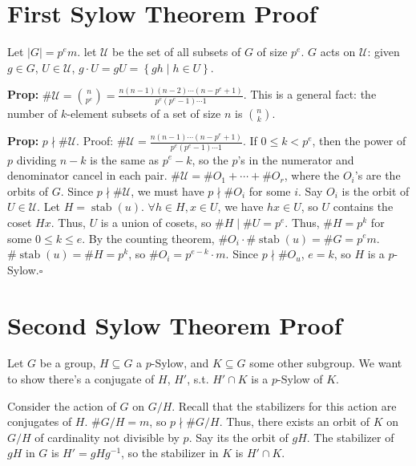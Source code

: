 \documentclass[10pt,letterpaper]{article}
\newcommand{\n}{\hfill\break}
\newcommand{\hangblock}[2]{\par\noindent\settowidth{\hangindent}{\textbf{#1: }}\textbf{#1: }\!\!\!#2}
\newcommand{\prop}[1]{\hangblock{Prop}{#1}}
\newcommand{\proven}{\;$\square$\n}
\newcommand{\card}[1]{\left|#1\right|}
\newcommand{\set}[1]{\left\{#1\right\}}
\newcommand{\inv}{^{-1}}
\newcommand{\ndiv}{\nmid}
\DeclareMathOperator{\stab}{stab}
\newcommand{\st}{s.t.}
\begin{document}
\newpage

\section*{First Sylow Theorem Proof}

\par\noindent
Let $\card{G}=p^{e}m$. let $\mathcal{U}$ be the set of all subsets of $G$ of size $p^{e}$.\n
$G$ acts on $\mathcal{U}$: given $g\in{}G$, $U\in\mathcal{U}$, $g\cdot{}U=gU=\set{gh\mid{}h\in{}U}$.\n

\prop{
	$\#\mathcal{U}=\binom{n}{p^{e}}=\frac{n(n-1)(n-2)\cdots(n-p^{e}+1)}{p^{e}(p^{e}-1)\cdots1}$. This is a general fact: the number of $k$-element subsets of a set of size $n$ is $\binom{n}{k}$.\n
}

\prop{
	$p\ndiv\#\mathcal{U}$.\n
	Proof: $\#\mathcal{U}=\frac{n(n-1)\cdots(n-p^{e}+1)}{p^{e}(p^{e}-1)\cdots1}$. If $0\le{}k<p^{e}$, then the power of $p$ dividing $n-k$ is the same as $p^{e}-k$, so the $p$'s in the numerator and denominator cancel in each pair.\n
	$\#\mathcal{U}=\#O_{1}+\cdots+\#O_{r}$, where the $O_{i}$'s are the orbits of $G$. Since $p\ndiv\#\mathcal{U}$, we must have $p\ndiv\#O_{i}$ for some $i$. Say $O_{i}$ is the orbit of $U\in\mathcal{U}$. Let $H=\stab(u)$. $\forall{}h\in{}H,x\in{}U$, we have $hx\in{}U$, so $U$ contains the coset $Hx$. Thus, $U$ is a union of cosets, so $\#H\mid\#U=p^{e}$. Thus, $\#H=p^{k}$ for some $0\le{}k\le{}e$. By the counting theorem, $\#O_{i}\cdot\#\stab(u)=\#G=p^{e}m$. $\#\stab(u)=\#H=p^{k}$, so $\#O_{i}=p^{e-k}\cdot{}m$. Since $p\ndiv\#O_{u}$, $e=k$, so $H$ is a $p$-Sylow.\proven
}

\section*{Second Sylow Theorem Proof}

\par\noindent
Let $G$ be a group, $H\subseteq{}G$ a $p$-Sylow, and $K\subseteq{}G$ some other subgroup. We want to show there's a conjugate of $H$, $H'$, \st{} $H'\cap{}K$ is a $p$-Sylow of $K$.\n

\par\noindent
Consider the action of $G$ on $G/H$. Recall that the stabilizers for this action are conjugates of $H$.\n
$\#G/H=m$, so $p\ndiv\#G/H$. Thus, there exists an orbit of $K$ on $G/H$ of cardinality not divisible by $p$. Say its the orbit of $gH$. The stabilizer of $gH$ in $G$ is $H'=gHg\inv$, so the stabilizer in $K$ is $H'\cap{}K$.\n
\end{document}
